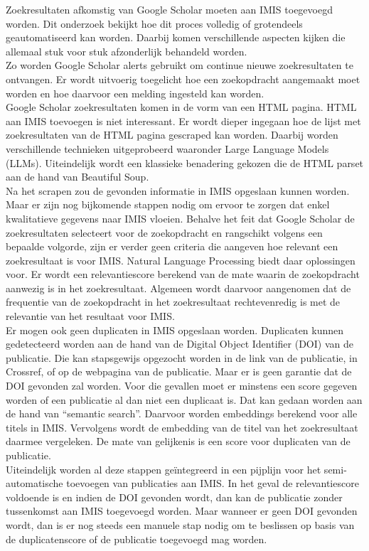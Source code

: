 Zoekresultaten afkomstig van Google Scholar moeten aan IMIS toegevoegd worden. Dit onderzoek bekijkt hoe dit proces volledig of grotendeels geautomatiseerd kan worden. Daarbij komen verschillende aspecten kijken die allemaal stuk voor stuk afzonderlijk behandeld worden.\\
Zo worden Google Scholar alerts gebruikt om continue nieuwe zoekresultaten te ontvangen. Er wordt uitvoerig toegelicht hoe een zoekopdracht aangemaakt moet worden en hoe daarvoor een melding ingesteld kan worden.\\
Google Scholar zoekresultaten komen in de vorm van een HTML pagina. HTML aan IMIS toevoegen is niet interessant. Er wordt dieper ingegaan hoe de lijst met zoekresultaten van de HTML pagina gescraped kan worden. Daarbij worden verschillende technieken uitgeprobeerd waaronder Large Language Models (LLMs). Uiteindelijk wordt een klassieke benadering gekozen die de HTML parset aan de hand van Beautiful Soup.\\
Na het scrapen zou de gevonden informatie in IMIS opgeslaan kunnen worden. Maar er zijn nog bijkomende stappen nodig om ervoor te zorgen dat enkel kwalitatieve gegevens naar IMIS vloeien.
Behalve het feit dat Google Scholar de zoekresultaten selecteert voor de zoekopdracht en rangschikt volgens een bepaalde volgorde, zijn er verder geen criteria die aangeven hoe relevant een zoekresultaat is voor IMIS. Natural Language Processing biedt daar oplossingen voor. Er wordt een relevantiescore berekend van de mate waarin de zoekopdracht aanwezig is in het zoekresultaat. Algemeen wordt daarvoor aangenomen dat de frequentie van de zoekopdracht in het zoekresultaat rechtevenredig is met de relevantie van het resultaat voor IMIS.\\
Er mogen ook geen duplicaten in IMIS opgeslaan worden. Duplicaten kunnen gedetecteerd worden aan de hand van de Digital Object Identifier (DOI) van de publicatie. Die kan stapsgewijs opgezocht worden in de link van de publicatie, in Crossref, of op de webpagina van de publicatie. Maar er is geen garantie dat de DOI gevonden zal worden. Voor die gevallen moet er minstens een score gegeven worden of een publicatie al dan niet een duplicaat is. Dat kan gedaan worden aan de hand van ``semantic search''. Daarvoor worden embeddings berekend voor alle titels in IMIS. Vervolgens wordt de embedding van de titel van het zoekresultaat daarmee vergeleken. De mate van gelijkenis is een score voor duplicaten van de publicatie.\\
Uiteindelijk worden al deze stappen geïntegreerd in een pijplijn voor het semi-automatische toevoegen van publicaties aan IMIS. In het geval de relevantiescore voldoende is en indien de DOI gevonden wordt, dan kan de publicatie zonder tussenkomst aan IMIS toegevoegd worden. Maar wanneer er geen DOI gevonden wordt, dan is er nog steeds een manuele stap nodig om te beslissen op basis van de duplicatenscore of de publicatie toegevoegd mag worden.
